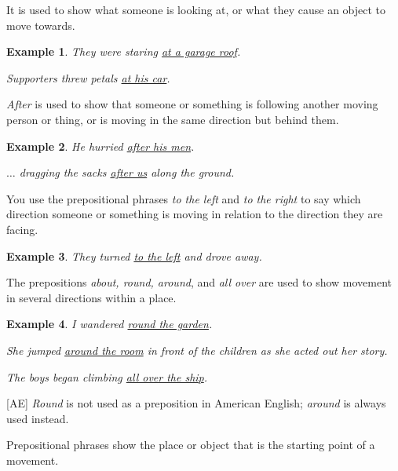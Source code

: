 \documentclass[oneside]{book}
\numberwithin{equation}{section}
\newtheorem{example}{Example}[section]
\begin{document}
It is used to show what someone is looking at, or what they cause an object to move towards.
\begin{example}
    They were staring \underline{at a garage roof}.
    
    Supporters threw petals \underline{at his car}.
\end{example}
\textit{After} is used to show that someone or something is following another moving person or thing, or is moving in the same direction but behind them.
\begin{example}
    He hurried \underline{after his men}.
    
    $\ldots$ dragging the sacks \underline{after us} along the ground.
\end{example}
%
\noindent{} You use the prepositional phrases \textit{to the left} and \textit{to the right} to say which direction someone or something is moving in relation to the direction they are facing.
\begin{example}
    They turned \underline{to the left} and drove away.
\end{example}
%
\noindent{} The prepositions \textit{about, round, around}, and \textit{all over} are used to show movement in several directions within a place.
\begin{example}
    I wandered \underline{round the garden}.
    
    She jumped \underline{around the room} in front of the children as she acted out her story.
    
    The boys began climbing \underline{all over the ship}.
\end{example}
[AE] \textit{Round} is not used as a preposition in American English; \textit{around} is always used instead.

%
\noindent{} Prepositional phrases show the place or object that is the starting point of a movement.
\end{document}
